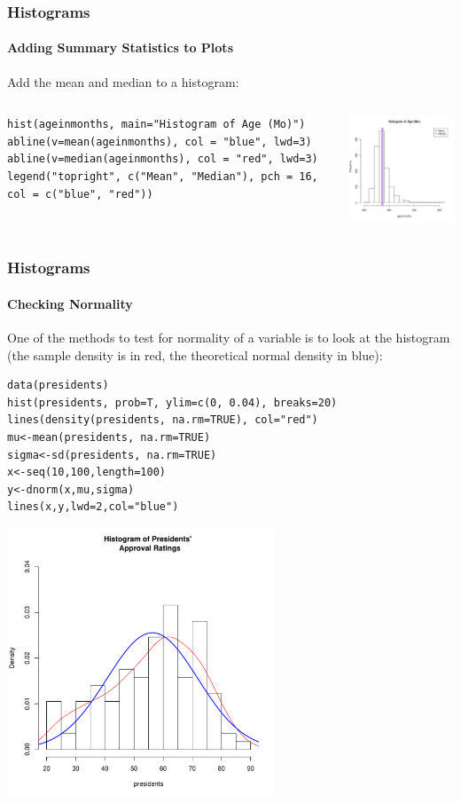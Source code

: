 \begin{frame}[fragile]
\frametitle{Histograms}
  \framesubtitle{Adding Summary Statistics to Plots}
Add the mean and median to a histogram:
    \begin{columns}

\begin{lstlisting}
hist(ageinmonths, main="Histogram of Age (Mo)")
abline(v=mean(ageinmonths), col = "blue", lwd=3)
abline(v=median(ageinmonths), col = "red", lwd=3)
legend("topright", c("Mean", "Median"), pch = 16, col = c("blue", "red"))
\end{lstlisting}

\begin{center}
\includegraphics[width = 45mm]{images/hist_meanmed.pdf}
\end{center}

\end{columns}
\end{frame}

\begin{frame}
\frametitle{Histograms}
\framesubtitle{Checking Normality}

One of the methods to test for normality of a variable is to look at the histogram (the sample density is in red, the theoretical normal density in blue):
  		\begin{lstlisting}
data(presidents)		
hist(presidents, prob=T, ylim=c(0, 0.04), breaks=20)
lines(density(presidents, na.rm=TRUE), col="red")
mu<-mean(presidents, na.rm=TRUE) 
sigma<-sd(presidents, na.rm=TRUE)
x<-seq(10,100,length=100) 
y<-dnorm(x,mu,sigma) 
lines(x,y,lwd=2,col="blue") 
		\end{lstlisting}

        \begin{center}
         \includegraphics[width=0.6\textwidth]{images/presHist.pdf}
        \end{center}
\end{frame}


